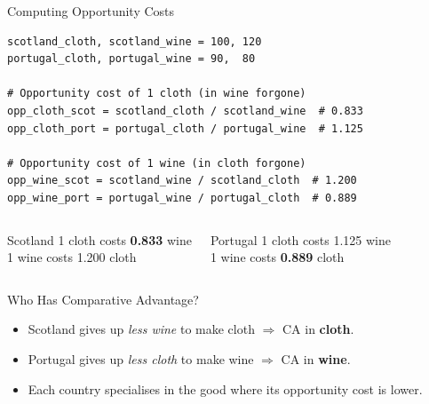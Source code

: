 \documentclass[aspectratio=169, 10pt]{beamer}
\begin{document}
\begin{frame}[fragile]{Computing Opportunity Costs}
\begin{lstlisting}
scotland_cloth, scotland_wine = 100, 120
portugal_cloth, portugal_wine = 90,  80

# Opportunity cost of 1 cloth (in wine forgone)
opp_cloth_scot = scotland_cloth / scotland_wine  # 0.833
opp_cloth_port = portugal_cloth / portugal_wine  # 1.125

# Opportunity cost of 1 wine (in cloth forgone)
opp_wine_scot = scotland_wine / scotland_cloth  # 1.200
opp_wine_port = portugal_wine / portugal_cloth  # 0.889
\end{lstlisting}
\vspace{0.3em}
\begin{columns}[T]
\begin{block}{Scotland}
  1 cloth costs \textbf{0.833} wine\\
  1 wine costs 1.200 cloth
\end{block}
\begin{block}{Portugal}
  1 cloth costs 1.125 wine\\
  1 wine costs \textbf{0.889} cloth
\end{block}
\end{columns}
\end{frame}

\begin{frame}{Who Has Comparative Advantage?}
\begin{center}
\end{center}
\vspace{0.5em}
\begin{itemize}
  \item Scotland gives up \textit{less wine} to make cloth
        $\Rightarrow$ CA in \textbf{cloth}.
  \item Portugal gives up \textit{less cloth} to make wine
        $\Rightarrow$ CA in \textbf{wine}.
  \item Each country specialises in the good where its
        opportunity cost is \alert{lower}.
\end{itemize}
\end{frame}
\end{document}
